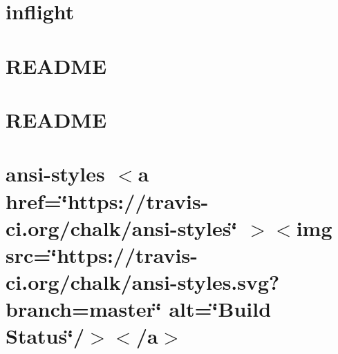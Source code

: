 \documentclass[twoside]{book}
\newcommand{\+}{\discretionary{\mbox{\scriptsize$\hookleftarrow$}}{}{}}
\begin{document}
\chapter{inflight}
\label{md__c___users_vaishnavi_jadhav__desktop__developer_code_mean_stack_example_client_node_modules_inflight__r_e_a_d_m_e}

\chapter{README}
\label{md__c___users_vaishnavi_jadhav__desktop__developer_code_mean_stack_example_client_node_modules_inherits__r_e_a_d_m_e}

\chapter{README}
\label{md__c___users_vaishnavi_jadhav__desktop__developer_code_mean_stack_example_client_node_modules_ini__r_e_a_d_m_e}

\chapter{ansi-\/styles \texorpdfstring{$<$}{<}a href=\char`\"{}https\+://travis-\/ci.\+org/chalk/ansi-\/styles\char`\"{} \texorpdfstring{$>$}{>}\texorpdfstring{$<$}{<}img src=\char`\"{}https\+://travis-\/ci.\+org/chalk/ansi-\/styles.\+svg?branch=master\char`\"{} alt=\char`\"{}\+Build Status\char`\"{}/\texorpdfstring{$>$}{>}\texorpdfstring{$<$}{<}/a\texorpdfstring{$>$}{>}}
\label{md__c___users_vaishnavi_jadhav__desktop__developer_code_mean_stack_example_client_node_modules_iab23a5863635fd2d0a6fbeab25bd08e1}

\end{document}
